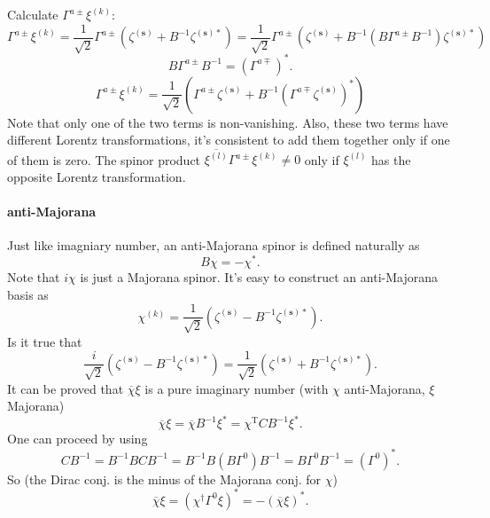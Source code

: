 
Calculate $\Gamma^{a\pm} \xi^{(k)}$:
\begin{equation*}
	\Gamma^{a\pm} \xi^{(k)} = \frac{1}{\sqrt{2}} \Gamma^{a\pm}
	\left( \zeta^{(\mathbf{s})} + B^{-1} \zeta^{(\mathbf{s})*} \right) 
	=\frac{1}{\sqrt{2}} \Gamma^{a\pm}
	\left( \zeta^{(\mathbf{s})} + B^{-1}(B\Gamma^{a\pm}B^{-1}) \zeta^{(\mathbf{s})*} \right) 
\end{equation*}
\[
B\Gamma^{a\pm}B^{-1} = (\Gamma^{a\mp})^*
.\]
\begin{equation}
	\Gamma^{a\pm} \xi^{(k)}  = \frac{1}{\sqrt{2}} 	\left(\Gamma^{a\pm}
 \zeta^{(\mathbf{s})} + B^{-1} (\Gamma^{a\mp}\zeta^{(\mathbf{s})})^* \right) 
\end{equation}
Note that only one of the two terms is non-vanishing.
Also, these two terms have different Lorentz transformations,
it's consistent to add them together only if one of them is zero.
The spinor product
$
	\overline{\xi^{(l)}} \Gamma^{a\pm} \xi^{(k)} \neq 0
$
only if $\xi^{(l)}$ has the opposite Lorentz transformation.

\paragraph{anti-Majorana}
Just like imagniary number, an anti-Majorana spinor is defined naturally as
\[
B \chi  =  - \chi^*
.\] 
Note that $i\chi$ is just a Majorana spinor.
It's easy to construct an anti-Majorana basis as
\[
	\chi^{(k)} = \frac{1}{\sqrt{2}} (\zeta^{(\mathbf{s})}
	- B^{-1} \zeta^{(\mathbf{s})*})
.\] 
Is it true that
\[
\frac{i}{\sqrt{2}} (\zeta^{(\mathbf{s})}
	- B^{-1} \zeta^{(\mathbf{s})*})
 = \frac{1}{\sqrt{2}} (\zeta^{(\mathbf{s})}
	+ B^{-1} \zeta^{(\mathbf{s})*})
.\] 
It can be proved that $\overline{\chi}\xi$ is a pure imaginary number
(with $\chi$ anti-Majorana, $\xi$ Majorana)
\[
	\overline{\chi}\xi = \overline{\chi} B^{-1}\xi^* 
	= \chi^{\text{T}} C B^{-1} \xi^*
.\] 
One can proceed by using
\[
	C B^{-1} = B^{-1} B C B^{-1} = B^{-1} B (B\Gamma^0) B^{-1}
	= B \Gamma^0 B^{-1} = (\Gamma^0)^*
.\]
So (the Dirac conj. is the minus of the Majorana conj. for $\chi$)
\[
\overline{\chi}\xi = (\chi^\dagger \Gamma^0 \xi)^*
= - (\overline{\chi}\xi)^*
.\] 
